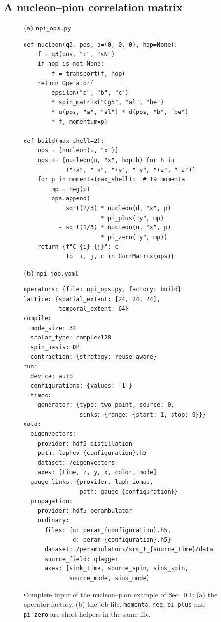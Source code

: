 \documentclass[a4paper,fleqn]{cas-dc}
\begin{document}
\subsection{A nucleon--pion correlation matrix}
\label{sec:example_npi}

\begin{figure}[pos=!b]
\centering
\begin{minipage}[t]{0.48\textwidth}
\footnotesize
\textbf{(a)} \texttt{npi\_ops.py}
\begin{verbatim}
def nucleon(q3, pos, p=(0, 0, 0), hop=None):
    f = q3(pos, "c", "sN")
    if hop is not None:
        f = transport(f, hop)
    return Operator(
        epsilon("a", "b", "c")
        * spin_matrix("Cg5", "al", "be")
        * u(pos, "a", "al") * d(pos, "b", "be")
        * f, momentum=p)

def build(max_shell=2):
    ops = [nucleon(u, "x")]
    ops += [nucleon(u, "x", hop=h) for h in
            ("+x", "-x", "+y", "-y", "+z", "-z")]
    for p in momenta(max_shell):  # 19 momenta
        mp = neg(p)
        ops.append(
            sqrt(2/3) * nucleon(d, "x", p)
                      * pi_plus("y", mp)
          - sqrt(1/3) * nucleon(u, "x", p)
                      * pi_zero("y", mp))
    return {f"C_{i}_{j}": c
            for i, j, c in CorrMatrix(ops)}
\end{verbatim}
\end{minipage}\hfill
\begin{minipage}[t]{0.48\textwidth}
\footnotesize
\textbf{(b)} \texttt{npi\_job.yaml}
\begin{verbatim}
operators: {file: npi_ops.py, factory: build}
lattice: {spatial_extent: [24, 24, 24],
          temporal_extent: 64}
compile:
  mode_size: 32
  scalar_type: complex128
  spin_basis: DP
  contraction: {strategy: reuse-aware}
run:
  device: auto
  configurations: {values: [1]}
  times:
    generator: {type: two_point, source: 0,
                sinks: {range: {start: 1, stop: 9}}}
data:
  eigenvectors:
    provider: hdf5_distillation
    path: laphev_{configuration}.h5
    dataset: /eigenvectors
    axes: [time, z, y, x, color, mode]
  gauge_links: {provider: laph_iomap,
                path: gauge_{configuration}}
  propagation:
    provider: hdf5_perambulator
    ordinary:
      files: {u: peram_{configuration}.h5,
              d: peram_{configuration}.h5}
      dataset: /perambulators/src_t_{source_time}/data
      source_field: qdagger
      axes: [sink_time, source_spin, sink_spin,
             source_mode, sink_mode]
\end{verbatim}
\end{minipage}
\caption{Complete input of the nucleon--pion example of Sec.~\ref{sec:example_npi}:
(a) the operator factory, (b) the job file. \texttt{momenta}, \texttt{neg},
\texttt{pi\_plus} and \texttt{pi\_zero} are short helpers in the same file.}
\label{fig:npi_job}
\end{figure}
\end{document}
